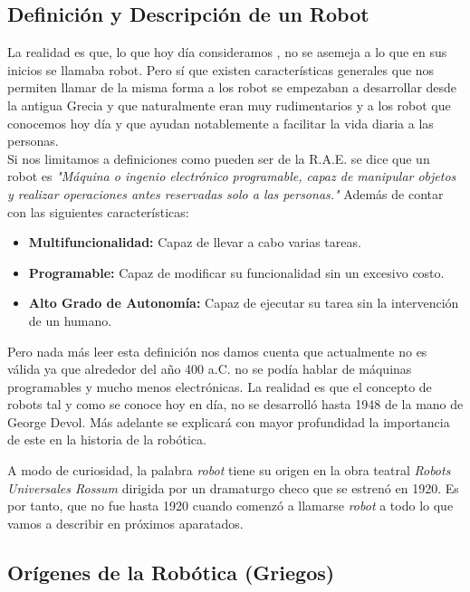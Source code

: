 
\subsection{Definición y Descripción de un Robot}


La realidad es que, lo que hoy día consideramos , no se asemeja a lo que en sus inicios se llamaba robot. Pero sí que existen características generales que nos permiten llamar de la misma forma a los robot se empezaban a desarrollar desde la antigua Grecia y que naturalmente eran muy rudimentarios y a los robot que conocemos hoy día y que ayudan notablemente a facilitar la vida diaria a las personas.\\

Si nos limitamos a definiciones como pueden ser de la R.A.E. se dice que un robot es \textit{"Máquina o ingenio electrónico programable, capaz de manipular objetos y realizar operaciones antes reservadas solo a las personas."} Además de contar con las siguientes características:

\begin{itemize}
\item \textbf{Multifuncionalidad:} Capaz de llevar a cabo varias tareas.
\item \textbf{Programable:} Capaz de modificar su funcionalidad sin un excesivo costo.
\item \textbf{Alto Grado de Autonomía:} Capaz de ejecutar su tarea sin la intervención de un humano.
\end{itemize}

Pero nada más leer esta definición nos damos cuenta que actualmente no es válida ya que alrededor del año 400 a.C. no se podía hablar de máquinas programables y mucho menos electrónicas. La realidad es que el concepto de robots tal y como se conoce hoy en día, no se desarrolló hasta 1948 de la mano de George Devol. Más adelante se explicará con mayor profundidad la importancia de este en la historia de la robótica.

A modo de curiosidad, la palabra \textit{robot} tiene su origen en la obra teatral \textit{Robots Universales Rossum} dirigida por un dramaturgo checo que se estrenó en 1920. Es por tanto, que no fue hasta 1920 cuando comenzó a llamarse \textit{robot} a todo lo que vamos a describir en próximos aparatados.

\subsection{Orígenes de la Robótica (Griegos)}

